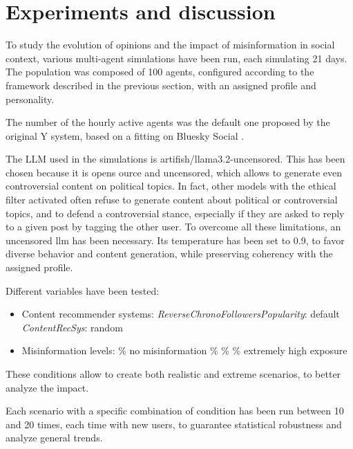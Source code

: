 \section{Experiments and discussion} %
\label{sec:experiments}

To study the evolution of opinions and the impact of misinformation in social context, various multi-agent simulations have been run, each simulating 21 days.
The population was composed of 100 agents, configured according to the framework described in the previous section, with an assigned profile and personality.

The number of the hourly active agents was the default one proposed by the original Y system, based on a fitting on Bluesky Social \cite{rossetti2024ysocialllmpoweredsocial, failla2024}.

The LLM used in the simulations is artifish/llama3.2-uncensored. This has been chosen because it is opens ource and uncensored, which allows to generate even controversial content on political topics.
In fact, other models with the ethical filter activated often refuse to generate content about political or controversial topics, and to defend a controversial stance, especially if they are asked to reply to a given post by tagging the other user.
To overcome all these limitations, an uncensored llm has been necessary.
Its temperature has been set to 0.9, to favor diverse behavior and content generation, while preserving coherency with the assigned profile.

Different variables have been tested:
\begin{itemize}
    \item Content recommender systems: %
        \subitem \textit{ReverseChronoFollowersPopularity}: default %
        \subitem \textit{ContentRecSys}: random
    \item Misinformation levels:
        \% no misinformation
        \%
        \%
        \% extremely high exposure
\end{itemize}

These conditions allow to create both realistic and extreme scenarios, to better analyze the impact.

Each scenario with a specific combination of condition has been run between 10 and 20 times, each time with new users, to guarantee statistical robustness and analyze general trends. 

